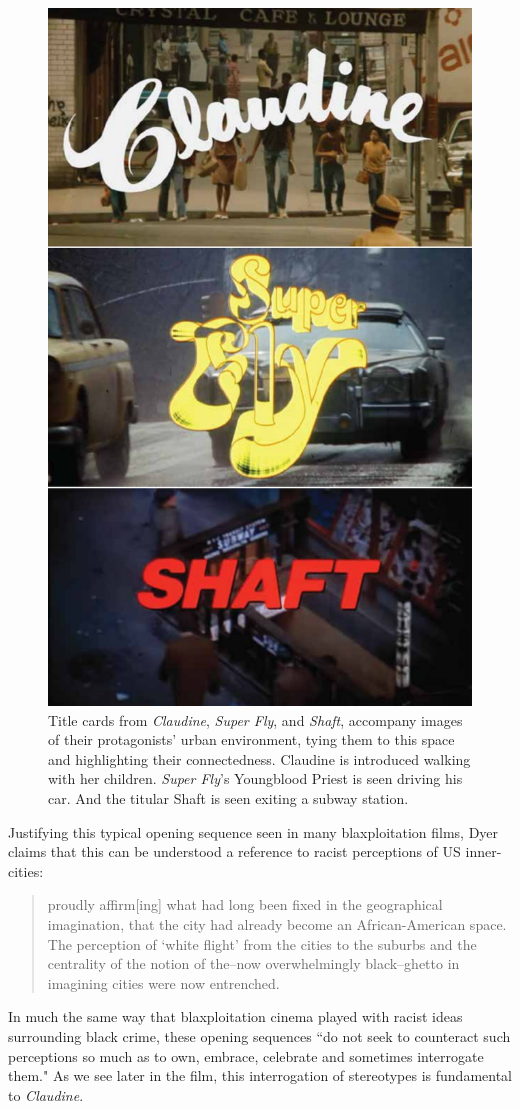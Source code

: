 \begin{figure}
    \centering
    \includegraphics[width=0.5\linewidth]{img/claudine-titlecard-comp.pdf}
    \caption{Title cards from \textit{Claudine}, \textit{Super Fly}, and \textit{Shaft}, accompany images of their protagonists' urban environment, tying them to this space and highlighting their connectedness. Claudine is introduced walking with her children. \textit{Super Fly}'s Youngblood Priest is seen driving his car. And the titular Shaft is seen exiting a subway station.}
    \label{fig:claudine-titlecard-comp}
\end{figure}


Justifying this typical opening sequence seen in many blaxploitation films, Dyer claims that this can be understood a reference to racist perceptions of US inner-cities:
\begin{quote}
proudly affirm[ing] what had long been fixed in the geographical imagination, that the city had already become an African-American space. The perception of `white flight' from the cities to the suburbs and the centrality of the notion of the–now overwhelmingly black–ghetto in imagining cities were now entrenched.\autocite[][158]{dyer_space_2012}
\end{quote}
In much the same way that blaxploitation cinema played with racist ideas surrounding black crime, these opening sequences ``do not seek to counteract such perceptions so much as to own, embrace, celebrate and sometimes interrogate them."\autocite[][158]{dyer_space_2012}
As we see later in the film, this interrogation of stereotypes is fundamental to \textit{Claudine}.

